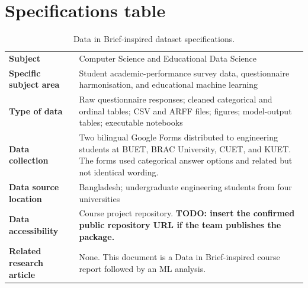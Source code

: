 \section{Specifications table}
\begin{table}[H]
\centering
\caption{Data in Brief-inspired dataset specifications.}
\label{tab:specifications}
\begin{tabularx}{\textwidth}{>{\bfseries}p{}Y}
\toprule
Subject & Computer Science and Educational Data Science\\
Specific subject area & Student academic-performance survey data, questionnaire harmonisation, and educational machine learning\\
Type of data & Raw questionnaire responses; cleaned categorical and ordinal tables; CSV and ARFF files; figures; model-output tables; executable notebooks\\
Data collection & Two bilingual Google Forms distributed to engineering students at BUET, BRAC University, CUET, and KUET. The forms used categorical answer options and related but not identical wording.\\
Data source location & Bangladesh; undergraduate engineering students from four universities\\
Data accessibility & Course project repository. \textbf{TODO: insert the confirmed public repository URL if the team publishes the package.}\\
Related research article & None. This document is a Data in Brief-inspired course report followed by an ML analysis.\\
\bottomrule
\end{tabularx}
\end{table}

